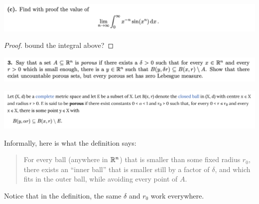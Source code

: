 



\begin{mdframed}
\includegraphics[width=400pt]{img/analysis--berkeley-202a-final-c137.png}
\end{mdframed}

\begin{proof}
  bound the integral above?
\end{proof}


\newpage
\begin{mdframed}
\includegraphics[width=400pt]{img/analysis--berkeley-202a-final-ef68.png}
\end{mdframed}

\begin{mdframed}
\includegraphics[width=400pt]{img/analysis--berkeley-202a-final-b463.png}
\end{mdframed}

Informally, here is what the definition says:

\begin{quote}
  For every ball (anywhere in $\mathbb{R}^n$) that is smaller than some fixed radius $r_0$, there exists an ``inner
  ball​'' that is smaller still by a factor of $\delta$, and which fits in the outer ball, while avoiding every
  point of $A$.
\end{quote}

Notice that in the definition, the same $\delta$ and $r_0$ work everywhere.

